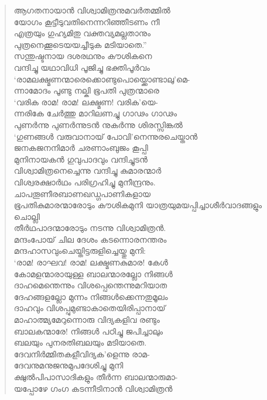 \begin{verse}
ആഗതനായാന്‍ വിശ്വാമിത്രനുമവര്‍തമ്മില്‍\\
യോഗം കൂട്ടീടുവതിനെന്നറിഞ്ഞീടണം നീ\\
എത്രയും ഗുഹ്യമിതു വക്തവ്യമല്ലതാനും\\
പുത്രനെക്കൂടെയയച്ചീടുക മടിയാതെ.”\\
സന്തുഷ്ടനായ ദശരഥനും കൗശികനെ\\
വന്ദിച്ചു യഥാവിധി പൂജിച്ചു ഭക്തിപൂര്‍വം\\
‘രാമലക്ഷ്മണന്മാരെക്കൊണ്ടുപൊയ്ക്കൊണ്ടാലു’മെ-\\
ന്നാമോദം പൂണ്ടു നല്കി ഭൂപതി പുത്രന്മാരെ\\
‘വരിക രാമ! രാമ! ലക്ഷ്മണ! വരിക’യെ-\\
ന്നരികേ ചേര്‍ത്തു മാറിലണച്ചു ഗാഢം ഗാഢം\\
പുണര്‍ന്നു പുണര്‍ന്നുടന്‍ നുകര്‍ന്നു ശിരസ്സിങ്കല്‍\\
‘ഗുണങ്ങള്‍ വരുവാനായ് പോവി’നെന്നുരചെയ്താന്‍\\
ജനകജനനിമാര്‍ ചരണാംബുജം കൂപ്പി\\
മുനിനായകന്‍ ഗുവുപാദവും വന്ദിച്ചുടന്‍\\
വിശ്വാമിത്രനെച്ചെന്നു വന്ദിച്ചു കുമാരന്മാര്‍\\
വിശ്വരക്ഷാര്‍ഥം പരിഗ്രഹിച്ചു മുനീന്ദ്രനും.\\
ചാപതൂണീരബാണഖഡ്ഗപാണികളായ\\
ഭൂപതികുമാരന്മാരോടും കൗശികമുനി യാത്രയുമയപ്പിച്ചാശീര്‍വാദങ്ങളും ചൊല്ലി\\
തീര്‍ഥപാദന്മാരോടും നടന്നു വിശ്വാമിത്രന്‍.\\
മന്ദംപോയ് ചില ദേശം കടന്നൊരനന്തരം\\
മന്ദഹാസവുംചെയ്തിട്ടരുളിച്ചെയ്തു മുനി:\\
‘രാമ! രാഘവ! രാമ! ലക്ഷ്മണകുമാര! കേള്‍\\
കോമളന്മാരായുള്ള ബാലന്മാരല്ലോ നിങ്ങള്‍\\
ദാഹമെന്തെന്നും വിശപ്പെന്തെന്നുമറിയാത\\
ദേഹങ്ങളല്ലോ മുന്നം നിങ്ങള്‍ക്കെന്നതുമൂലം\\
ദാഹവും വിശപ്പുമുണ്ടാകാതെയിരിപ്പാനായ്\\
മാഹാത്മ്യമേറുന്നൊരു വിദ്യകളിവ രണ്ടും\\
ബാലകന്മാരേ! നിങ്ങള്‍ പഠിച്ചു ജപിച്ചാലും\\
ബലയും പുനരതിബലയും മടിയാതെ.\\
ദേവനിര്‍മ്മിതകളീവിദ്യക’ളെന്നു രാമ-\\
ദേവനുമനുജനുമുപദേശിച്ചു മുനി\\
ക്ഷുല്‍പിപാസാദികളും തീര്‍ന്ന ബാലന്മാരുമാ-\\
യപ്പോഴേ ഗംഗ കടന്നീടിനാന്‍ വിശ്വാമിത്രന്‍
\end{verse}

